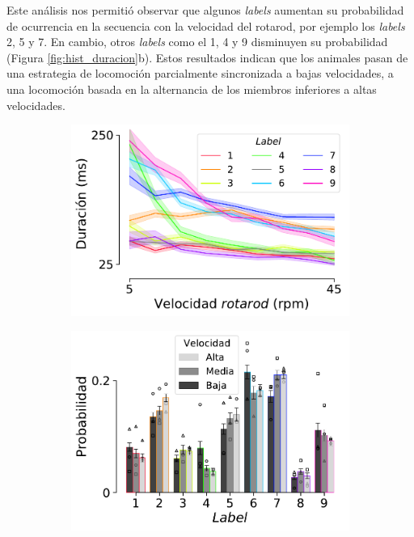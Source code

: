 Este análisis nos permitió observar que algunos \textit{labels} aumentan su probabilidad de ocurrencia en la secuencia con la velocidad del rotarod, por ejemplo los \textit{labels} 2, 5 y 7. En cambio, otros \textit{labels} como el 1, 4 y 9 disminuyen su probabilidad (Figura \ref{fig:hist_duracion}b). Estos resultados indican que los animales pasan de una estrategia de locomoción parcialmente sincronizada a bajas velocidades, a una locomoción basada en la alternancia de los miembros inferiores a altas velocidades.  

\begin{figure}[!htbp]
    \centering
    \begin{subfigure}{.49\textwidth}
        \includegraphics[width=1\textwidth]{figuras/expertos/labels/line_duration_speed.pdf}
        \caption{}
    \end{subfigure}
    \hspace{\fill}
    \begin{subfigure}{.49\textwidth}
        \includegraphics[width=1\textwidth]{figuras/expertos/labels/speed_hist_prob_label.pdf}

\end{subfigure}
\end{figure}
